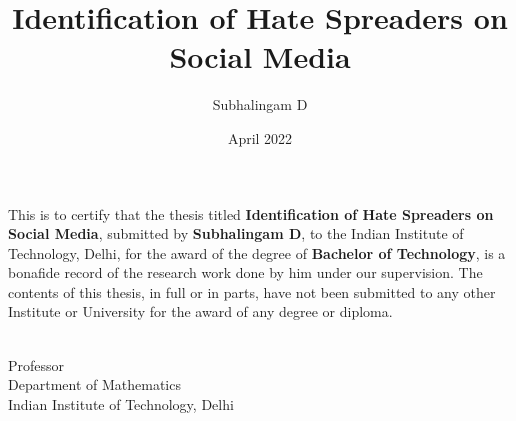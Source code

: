 \documentclass[BTech]{iitddiss}
\begin{document}

\title{Identification of Hate Spreaders on Social Media}

\author{Subhalingam D}
\date{April 2022}

\maketitle

\certificate

\vspace*{0.5in}

\noindent This is to certify that the thesis titled {\bf Identification of Hate Spreaders on Social Media}, submitted by {\bf Subhalingam D}, to the Indian Institute of Technology, Delhi, for
the award of the degree of {\bf Bachelor of Technology}, is a bonafide
record of the research work done by him under our supervision. The
contents of this thesis, in full or in parts, have not been submitted
to any other Institute or University for the award of any degree or
diploma.

\vspace*{1.5in}

\begin{singlespacing}
\hspace*{-0.25in}
\parbox{3.5in}{
 \\
\noindent Professor \\
\noindent Department of Mathematics\\
\noindent Indian Institute of Technology, Delhi \\
}
\hspace*{1.0in}
\end{singlespacing}


\acknowledgements




\abstract
\end{document}
